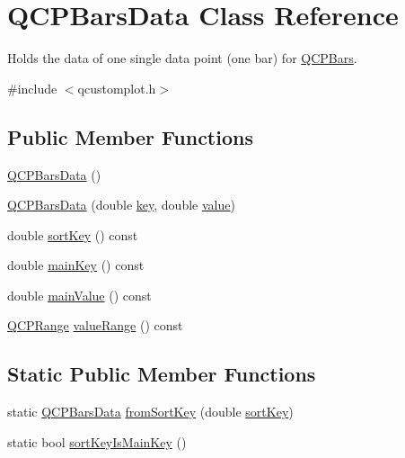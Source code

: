 \hypertarget{class_q_c_p_bars_data}{}\section{Q\+C\+P\+Bars\+Data Class Reference}
\label{class_q_c_p_bars_data}


Holds the data of one single data point (one bar) for \hyperlink{class_q_c_p_bars}{Q\+C\+P\+Bars}.  




{\ttfamily \#include $<$qcustomplot.\+h$>$}

\subsection*{Public Member Functions}
\begin{DoxyCompactItemize}
\item 
\hyperlink{class_q_c_p_bars_data_a800794d4c5fea22eeb8bade20798496b}{Q\+C\+P\+Bars\+Data} ()
\item 
\hyperlink{class_q_c_p_bars_data_a4158816a69e2c675885f48afa2b5acc9}{Q\+C\+P\+Bars\+Data} (double \hyperlink{class_q_c_p_bars_data_a09b492217dc03ee1c0348a2f2e6e0a04}{key}, double \hyperlink{class_q_c_p_bars_data_ab636644fb40630f3b1b72f44d65ec072}{value})
\item 
double \hyperlink{class_q_c_p_bars_data_a107d22d84f336bf6e3c3ad0133a5d2f6}{sort\+Key} () const
\item 
double \hyperlink{class_q_c_p_bars_data_a8c1d09e63b0e90a6c1fba56ddeaa8964}{main\+Key} () const
\item 
double \hyperlink{class_q_c_p_bars_data_a360d975e587f9e84259aaec172efb10b}{main\+Value} () const
\item 
\hyperlink{class_q_c_p_range}{Q\+C\+P\+Range} \hyperlink{class_q_c_p_bars_data_acf3e6479dacacd6c81eebe7d4cd62185}{value\+Range} () const
\end{DoxyCompactItemize}
\subsection*{Static Public Member Functions}
\begin{DoxyCompactItemize}
\item 
static \hyperlink{class_q_c_p_bars_data}{Q\+C\+P\+Bars\+Data} \hyperlink{class_q_c_p_bars_data_ad170d4e90498005ec319338910252ba8}{from\+Sort\+Key} (double \hyperlink{class_q_c_p_bars_data_a107d22d84f336bf6e3c3ad0133a5d2f6}{sort\+Key})
\item 
static bool \hyperlink{class_q_c_p_bars_data_aebaabda335bd4c9f81bd585d16b63aa8}{sort\+Key\+Is\+Main\+Key} ()
\end{DoxyCompactItemize}
